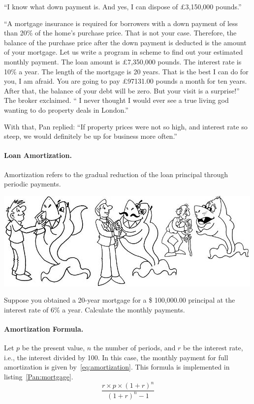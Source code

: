 \documentclass[a4paper,12pt]{book}
\begin{document}
“I know what down payment is. And yes, I can dispose
of £3,150,000 pounds.”

“A mortgage insurance is required for borrowers with
a down payment of less than 20\% of the home's purchase
price. That is not your case. Therefore, the balance of
the purchase price after the down payment is deducted
is the amount of your mortgage. Let us write a program
in scheme to find out your estimated monthly payment.
The loan amount is £7,350,000 pounds. The interest rate
is 10\% a year. The length of the mortgage is 20 years.
That is the best I can do for you, I am afraid.
You are going to pay £97131.00 pounds a month for
ten years. After that, the balance of your debt
will be zero. But your visit is a surprise!”
The broker exclaimed. “ I never thought I would
ever see a true living god wanting to do property
deals in London.”

With that, Pan replied: “If property prices
were not so high, and interest rate so steep,
we would definitely be up for business more often.”



\paragraph{Loan Amortization.}
Amortization refers to the gradual reduction
of the loan principal through periodic payments.

\includegraphics{figs-prefix/agingshark.jpg}

Suppose you obtained a 20-year mortgage
for a \$ 100,000.00 principal at the interest
rate of 6\% a year. Calculate the monthly payments.

\paragraph{Amortization Formula.} Let $p$ be the
present value, $n$ the number of periods,
and $r$ be the
interest rate, i.e., the interest divided by 100.
In this case, the monthly payment for full
amortization is given by~\ref{eq:amortization}.
This formula is implemented in
listing~\ref{Pan:mortgage}.
\begin{equation}
\frac{r\times p\times(1+r)^n}{(1+r)^n - 1}
\label{eq:amortization}
\end{equation}
\end{document}
